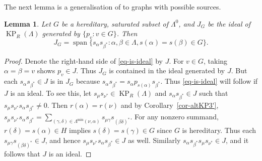 \documentclass[a4paper,12pt]{amsart}
\numberwithin{equation}{section}
\newtheorem{lemma}[thm]{Lemma}
\theoremstyle{definition}
\theoremstyle{remark}
\begin{document}
The next lemma is a generalisation of \cite[Lemma~5.4]{ACaHR} to graphs with possible sources.

\begin{lemma}\label{ideal-gen}  Let $G$ be a hereditary, saturated subset of $\Lambda^0$, and $J_G$ be the ideal of $\operatorname{KP}_R(\Lambda)$ generated by $\{p_v:v\in G\}$. 
 Then 
 \begin{equation}J_G={\operatorname{\mathrm{span}}}\{s_\alpha s_{\beta^*}:\alpha,\beta\in\Lambda, s(\alpha)=s(\beta)\in G\}.\label{eq-is-ideal}\end{equation}
\end{lemma}

\begin{proof} Denote the right-hand side of \eqref{eq-is-ideal} by $J$. For $v\in G$, taking $\alpha=\beta=v$ shows $p_v\in J$. Thus $J_G$ is contained in the ideal generated by $J$.   But each $s_\alpha s_{\beta^*}\in J$ is in $J_G$ because $s_\alpha s_{\beta^*}=s_\alpha p_{s(\alpha)}s_{\beta^*}$.  Thus \eqref{eq-is-ideal}  will follow if  $J$ is an ideal.  To see this, let $s_\mu s_{\nu^*}\in\operatorname{KP}_R(\Lambda)$ and $s_\alpha s_{\beta^*}\in J$ such that $s_\mu s_{\nu^*}s_\alpha s_{\beta^*}\neq 0$. Then $r(\alpha)=r(\nu)$ and by Corollary~\ref{cor-altKP3'}, $s_\mu s_{\nu^*}s_\alpha s_{\beta^*}=\sum_{(\gamma,\delta)\in\Lambda^{\min}(\nu,\alpha)}s_{\mu\gamma}s_{(\beta\delta)^*}$.  For any nonzero summand, $r(\delta)=s(\alpha)\in H$ implies $s(\delta)=s(\gamma)\in G$ since $G$ is hereditary.  Thus each $s_{\mu\gamma}s_{(\beta\delta)^*}\in J$, and hence $s_\mu s_{\nu^*}s_\alpha s_{\beta^*}\in J$ as well.  Similarly $s_\alpha s_{\beta^*}s_\mu s_{\nu^*}\in J$, and it follows that $J$ is an ideal. 
\end{proof}
\end{document}
